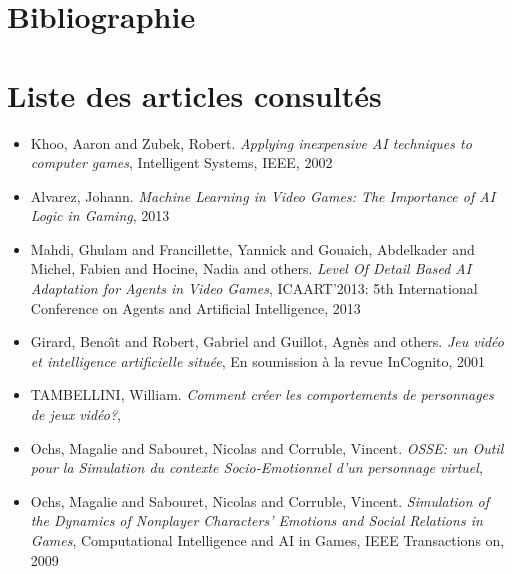 \documentclass[asi]{picINSAIA}
\begin{document}
\chapter{Bibliographie}
\begingroup
\def\chapter*#1{}
{}

\endgroup

\chapter{Liste des articles consultés}
\begin{itemize}

\item Khoo, Aaron and Zubek, Robert.
  \textsl{Applying inexpensive AI techniques to computer games}, 
  Intelligent Systems, IEEE, 
2002


\item Alvarez, Johann.
  \textsl{Machine Learning in Video Games: The Importance of AI Logic in Gaming},
  2013


\item Mahdi, Ghulam and Francillette, Yannick and Gouaich, Abdelkader and Michel, Fabien and Hocine, Nadia and others.
  \textsl{Level Of Detail Based AI Adaptation for Agents in Video Games},
  ICAART'2013: 5th International Conference on Agents and Artificial Intelligence,
  2013


\item Girard, Beno{\^\i}t and Robert, Gabriel and Guillot, Agn{\`e}s and others.
  \textsl{Jeu vid{\'e}o et intelligence artificielle situ{\'e}e},
  En soumission {\`a} la revue InCognito,
  2001


\item TAMBELLINI, William.
  \textsl{Comment cr{\'e}er les comportements de personnages de jeux vid{\'e}o?},



\item Ochs, Magalie and Sabouret, Nicolas and Corruble, Vincent.
  \textsl{OSSE: un Outil pour la Simulation du contexte Socio-Emotionnel d’un personnage virtuel},



\item Ochs, Magalie and Sabouret, Nicolas and Corruble, Vincent.
  \textsl{Simulation of the Dynamics of Nonplayer Characters' Emotions and Social Relations in Games},
  Computational Intelligence and AI in Games, IEEE Transactions on,
  2009



\end{itemize}
\end{document}
